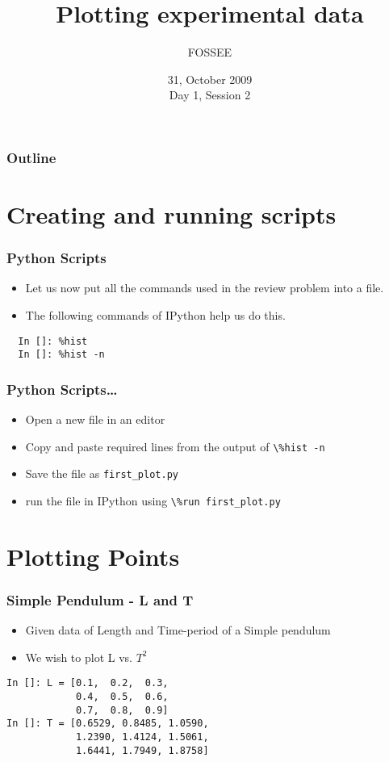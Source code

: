\documentclass[14pt,compress]{beamer}
\title[Plotting using Python]{Plotting experimental data\\}
\author[FOSSEE] {FOSSEE}
\institute[IIT Bombay] {Department of Aerospace Engineering\\IIT Bombay}
\date[] {31, October 2009\\Day 1, Session 2}
\newcommand{\typ}[1]{\lstinline{#1}}
\begin{document}
\begin{frame}
  \titlepage
\end{frame}

\begin{frame}
  \frametitle{Outline}
  \tableofcontents
\end{frame}

\section{Creating and running scripts}
\begin{frame}[fragile]
\frametitle{Python Scripts}
\begin{itemize}
\item Let us now put all the commands used in the review problem into a file. 
\item The following commands of IPython help us do this. 
\end{itemize}
\begin{lstlisting}
  In []: %hist
  In []: %hist -n
\end{lstlisting}
\end{frame}

\begin{frame}
\frametitle{Python Scripts\ldots}
  \begin{itemize}
    \item Open a new file in an \alert{editor}
    \item Copy and paste required lines from the output of \typ{\%hist -n}
    \item Save the file as \typ{first_plot.py}
  \end{itemize}
  \begin{itemize}
  \item run the file in IPython using \typ{\%run first_plot.py}\\
  \end{itemize}
\end{frame}

\section{Plotting Points}
\begin{frame}[fragile]
\frametitle{Simple Pendulum - L and T}
  \begin{itemize}
    \item Given data of Length and Time-period of a Simple pendulum 
    \item We wish to plot L vs. \alert{$T^2$}
  \end{itemize}    
\begin{lstlisting}
In []: L = [0.1,  0.2,  0.3,  
            0.4,  0.5,  0.6,  
            0.7,  0.8,  0.9]
In []: T = [0.6529, 0.8485, 1.0590, 
            1.2390, 1.4124, 1.5061, 
            1.6441, 1.7949, 1.8758]
\end{lstlisting}
\end{frame}
\end{document}

